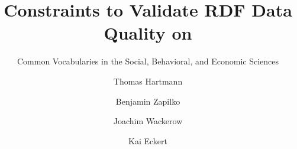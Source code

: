 \documentclass{llncs}
\begin{document}
\renewcommand{\arraystretch}{1.3}
%
%
\title{Constraints to Validate RDF Data Quality on}
\subtitle{Common Vocabularies in the Social, Behavioral, and Economic Sciences}

%
\author{Thomas Hartmann \and Benjamin Zapilko \and Joachim Wackerow \and Kai Eckert}
%
\authorrunning{} %
%

\maketitle              %
\end{document}
